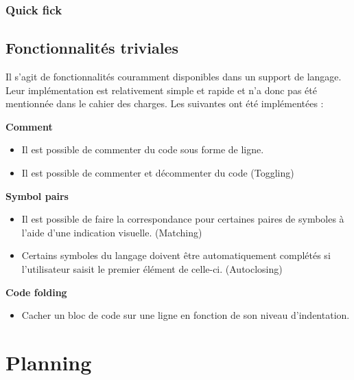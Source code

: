 \documentclass[
    iict, %
    il, %
]{heig-tb}
\begin{document}

\subsection{Quick fick}

\section{Fonctionnalités triviales}
Il s'agit de fonctionnalités couramment disponibles dans un support de langage. Leur implémentation est relativement simple et rapide et n'a donc pas été mentionnée dans le cahier des charges.
Les suivantes ont été implémentées :

\textbf{Comment}
\begin{itemize}
    \item Il est possible de commenter du code sous forme de ligne.
    \item Il est possible de commenter et décommenter du code (Toggling)
\end{itemize}

\textbf{Symbol pairs}
\begin{itemize}
    \item Il est possible de faire la correspondance pour certaines paires de symboles à l'aide d'une indication visuelle. (Matching)
    \item Certains symboles du langage doivent être automatiquement complétés si l'utilisateur saisit le premier élément de celle-ci. (Autoclosing)
\end{itemize}

\textbf{Code folding}
\begin{itemize}
    \item Cacher un bloc de code sur une ligne en fonction de son niveau d'indentation.
\end{itemize}


\chapter{Planning}

\end{document}

